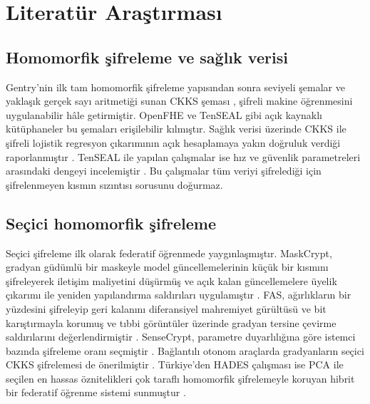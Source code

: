 \section{Literatür Araştırması}\label{literaturarastirmasi}

\subsection{Homomorfik şifreleme ve sağlık verisi}\label{lit:he}

Gentry'nin ilk tam homomorfik şifreleme yapısından \cite{gentry2009fhe} sonra seviyeli şemalar \cite{brakerski2012leveled} ve yaklaşık gerçek sayı aritmetiği sunan CKKS şeması \cite{cheon2017ckks}, şifreli makine öğrenmesini uygulanabilir hâle getirmiştir. OpenFHE \cite{badawi2022openfhe} ve TenSEAL \cite{benaissa2021tenseal} gibi açık kaynaklı kütüphaneler bu şemaları erişilebilir kılmıştır. Sağlık verisi üzerinde CKKS ile şifreli lojistik regresyon çıkarımının açık hesaplamaya yakın doğruluk verdiği raporlanmıştır \cite{kahya2022fheml}. TenSEAL ile yapılan çalışmalar ise hız ve güvenlik parametreleri arasındaki dengeyi incelemiştir \cite{whiting2025tenseal}. Bu çalışmalar tüm veriyi şifrelediği için şifrelenmeyen kısmın sızıntısı sorusunu doğurmaz.

\subsection{Seçici homomorfik şifreleme}\label{lit:selective}

Seçici şifreleme ilk olarak federatif öğrenmede yaygınlaşmıştır. MaskCrypt, gradyan güdümlü bir maskeyle model güncellemelerinin küçük bir kısmını şifreleyerek iletişim maliyetini düşürmüş ve açık kalan güncellemelere üyelik çıkarımı ile yeniden yapılandırma saldırıları uygulamıştır \cite{hu2025maskcrypt}. FAS, ağırlıkların bir yüzdesini şifreleyip geri kalanını diferansiyel mahremiyet gürültüsü ve bit karıştırmayla korumuş ve tıbbi görüntüler üzerinde gradyan tersine çevirme saldırılarını değerlendirmiştir \cite{korkmaz2025fas}. SenseCrypt, parametre duyarlılığına göre istemci bazında şifreleme oranı seçmiştir \cite{li2025sensecrypt}. Bağlantılı otonom araçlarda gradyanların seçici CKKS şifrelemesi de önerilmiştir \cite{najjar2025cavs}. Türkiye'den HADES çalışması ise PCA ile seçilen en hassas öznitelikleri çok taraflı homomorfik şifrelemeyle koruyan hibrit bir federatif öğrenme sistemi sunmuştur \cite{kaynak2026hades}.

